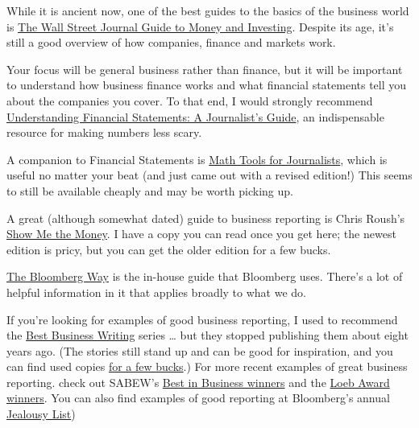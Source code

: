 \documentclass[
  12pt,
  american,
  letterpaperpaper,
  extrafontsizes,onecolumn,openright
  ]{memoir}
\begin{document}
While it is ancient now, one of the best guides to the basics of the business world is \href{https://www.amazon.com/Street-Journal-Guide-Understanding-Investing/dp/0684869020}{The Wall Street Journal Guide to Money and Investing}. Despite its age, it's still a good overview of how companies, finance and markets work.

Your focus will be general business rather than finance, but it will be important to understand how business finance works and what financial statements tell you about the companies you cover. To that end, I would strongly recommend \href{https://www.amazon.com/Understanding-Financial-Statements-Journalists-Guide/dp/0972993738/ref=sr_1_1}{Understanding Financial Statements: A Journalist's Guide}, an indispensable resource for making numbers less scary.

A companion to Financial Statements is \href{https://www.amazon.com/Math-Tools-Journalists-Kathleen-Wickham/dp/0916242919/ref=sr_1_2}{Math Tools for Journalists}, which is useful no matter your beat (and just came out with a revised edition!) This seems to still be available cheaply and may be worth picking up.

A great (although somewhat dated) guide to business reporting is Chris Roush's \href{https://www.amazon.com/Show-Money-Economics-Communication-Routledge/dp/0805849556/ref=tmm_pap_swatch_0}{Show Me the Money}. I have a copy you can read once you get here; the newest edition is pricy, but you can get the older edition for a few bucks.

\href{https://www.amazon.com/Bloomberg-Way-Guide-Reporters-Editors/dp/1118030176/ref=sr_1_1}{The Bloomberg Way} is the in-house guide that Bloomberg uses. There's a lot of helpful information in it that applies broadly to what we do.

If you're looking for examples of good business reporting, I used to recommend the \href{https://www.foxtalebookshoppe.com/search/Starkman\%2C\%20Dean?type=author}{Best Business Writing} series \ldots{} but they stopped publishing them about eight years ago. (The stories still stand up and can be good for inspiration, and you can find used copies \href{https://www.amazon.com/s?k=starkman+dean\&crid=180T8U6GUGQ50\&sprefix=starkman+dean\%2Caps\%2C88\&ref=nb_sb_noss}{for a few bucks}.) For more recent examples of great business reporting. check out SABEW's \href{https://sabew.org/contestsawards/best-in-business-past-honorees/}{Best in Business winners} and the \href{http://theloebawards.com/}{Loeb Award winners}. You can also find examples of good reporting at Bloomberg's annual \href{https://www.google.com/search?q=bloomberg+jealousy+list\&rlz=1C5GCEM_enUS1022US1022\&oq=bloomberg+jealous\&gs_lcrp=EgZjaHJvbWUqBggBEEUYOzIGCAAQRRg5MgYIARBFGDvSAQg0MTgyajBqN6gCALACAA\&sourceid=chrome\&ie=UTF-8}{Jealousy List})
\end{document}
